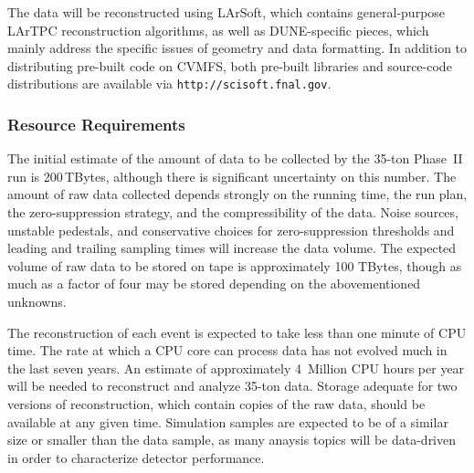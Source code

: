 The data will be reconstructed using LArSoft, which contains general-purpose LArTPC reconstruction algorithms,
as well as DUNE-specific pieces, which mainly address the specific issues of geometry and data formatting.
In addition to distributing pre-built code on CVMFS, both pre-built libraries and source-code distributions
are available via {\tt http://scisoft.fnal.gov}.


\subsubsection{Resource Requirements}

The initial estimate of the amount of data to be collected by the 35-ton Phase~II run is 200\,TBytes,
although there is significant uncertainty on this number.  The amount of raw data collected
depends strongly on the running time, the run plan, the zero-suppression strategy, and the
compressibility of the data.  Noise sources, unstable pedestals, and conservative choices for zero-suppression
thresholds and leading and trailing sampling times will increase the data volume.
The expected volume of raw data to be stored on tape is approximately 100 TBytes, though as much as a factor
of four may be stored depending on the abovementioned unknowns.

The reconstruction of each event is expected to take less than one minute of CPU time.  The rate at which
a CPU core can process data has not evolved much in the last seven years.  An estimate of approximately
4~Million CPU hours per year will be needed to reconstruct and analyze 35-ton data.  Storage adequate for
two versions of reconstruction, which contain copies of the raw data, should be available at any given time.
Simulation samples are expected to be of a similar size or smaller than the data sample, as many anaysis
topics will be data-driven in order to characterize detector performance.
